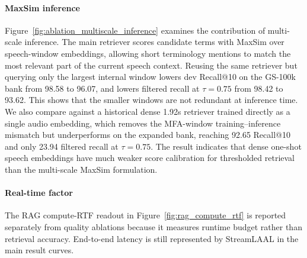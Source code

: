 \paragraph{MaxSim inference}
Figure~\ref{fig:ablation_multiscale_inference} examines the contribution of multi-scale inference. The main retriever scores candidate terms with MaxSim over speech-window embeddings, allowing short terminology mentions to match the most relevant part of the current speech context. Reusing the same retriever but querying only the largest internal window lowers dev Recall@10 on the GS-100k bank from 98.58 to 96.07, and lowers filtered recall at $\tau{=}0.75$ from 98.42 to 93.62. This shows that the smaller windows are not redundant at inference time. We also compare against a historical dense 1.92s retriever trained directly as a single audio embedding, which removes the MFA-window training--inference mismatch but underperforms on the expanded bank, reaching 92.65 Recall@10 and only 23.94 filtered recall at $\tau{=}0.75$. The result indicates that dense one-shot speech embeddings have much weaker score calibration for thresholded retrieval than the multi-scale MaxSim formulation.

\paragraph{Real-time factor}
The RAG compute-RTF readout in Figure~\ref{fig:rag_compute_rtf} is reported separately from quality ablations because it measures runtime budget rather than retrieval accuracy. End-to-end latency is still represented by StreamLAAL in the main result curves.

\clearpage
